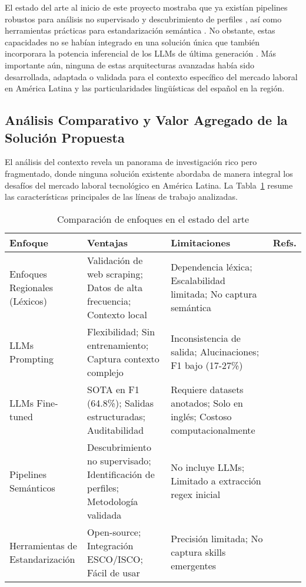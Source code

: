 El estado del arte al inicio de este proyecto mostraba que ya existían pipelines robustos para análisis no supervisado y descubrimiento de perfiles \cite{lukauskas2023}, así como herramientas prácticas para estandarización semántica \cite{kavargyris2025}. No obstante, estas capacidades no se habían integrado en una solución única que también incorporara la potencia inferencial de los LLMs de última generación \cite{herandi2024}. Más importante aún, ninguna de estas arquitecturas avanzadas había sido desarrollada, adaptada o validada para el contexto específico del mercado laboral en América Latina y las particularidades lingüísticas del español en la región.

\subsection{Análisis Comparativo y Valor Agregado de la Solución Propuesta}

El análisis del contexto revela un panorama de investigación rico pero fragmentado, donde ninguna solución existente abordaba de manera integral los desafíos del mercado laboral tecnológico en América Latina. La Tabla~\ref{tab:estado-arte-comparativo} resume las características principales de las líneas de trabajo analizadas.

\begin{table}[H]
\centering
\caption{Comparación de enfoques en el estado del arte}
\label{tab:estado-arte-comparativo}
\small
\begin{tabular}{|p{2.5cm}|p{3.5cm}|p{3.5cm}|p{2.5cm}|}
\hline
\textbf{Enfoque} & \textbf{Ventajas} & \textbf{Limitaciones} & \textbf{Refs.} \\
\hline
Enfoques Regionales (Léxicos) & Validación de web scraping; Datos de alta frecuencia; Contexto local & Dependencia léxica; Escalabilidad limitada; No captura semántica & \cite{rubio2025, aguilera2018, martinez2024} \\
\hline
LLMs Prompting & Flexibilidad; Sin entrenamiento; Captura contexto complejo & Inconsistencia de salida; Alucinaciones; F1 bajo (17-27\%) & \cite{nguyen2024} \\
\hline
LLMs Fine-tuned & SOTA en F1 (64.8\%); Salidas estructuradas; Auditabilidad & Requiere datasets anotados; Solo en inglés; Costoso computacionalmente & \cite{herandi2024, zhang2022} \\
\hline
Pipelines Semánticos & Descubrimiento no supervisado; Identificación de perfiles; Metodología validada & No incluye LLMs; Limitado a extracción regex inicial & \cite{lukauskas2023} \\
\hline
Herramientas de Estandarización & Open-source; Integración ESCO/ISCO; Fácil de usar & Precisión limitada; No captura skills emergentes & \cite{kavargyris2025} \\
\hline
\end{tabular}
\end{table}

